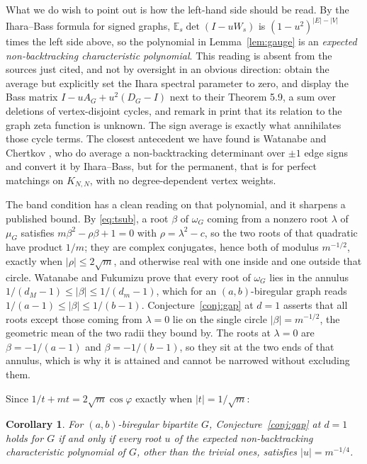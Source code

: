 \documentclass[11pt]{article}
\newtheorem{corollary}[theorem]{Corollary}
\theoremstyle{remark}
\begin{document}
What we do wish to point out is how the left-hand side should be read. By the
Ihara--Bass formula for signed graphs, $\mathbb E_s\det(I-uW_s)$ is
$(1-u^2)^{|E|-|V|}$ times the left side above, so the polynomial in
Lemma~\ref{lem:gauge} is an \emph{expected non-backtracking characteristic
polynomial}. This reading is absent from the sources just cited, and not by
oversight in an obvious direction: \cite{CC} obtain the average but explicitly set
the Ihara spectral parameter to zero, and \cite{WF} display the Bass matrix
$I-uA_G+u^2(D_G-I)$ next to their Theorem 5.9, a sum over deletions of
vertex-disjoint cycles, and remark in print that its relation to the graph zeta
function is unknown. The sign average is exactly what annihilates those cycle
terms. The closest antecedent we have found is Watanabe and Chertkov
\cite[Thm.~4]{WC}, who do average a non-backtracking determinant over $\pm1$ edge
signs and convert it by Ihara--Bass, but for the permanent, that is for perfect
matchings on $K_{N,N}$, with no degree-dependent vertex weights.

The band condition has a clean reading on that polynomial, and it sharpens a
published bound. By \eqref{eq:tsub}, a root $\beta$ of $\omega_G$ coming from a
nonzero root $\lambda$ of $\mu_G$ satisfies $m\beta^2-\rho\beta+1=0$ with
$\rho=\lambda^2-c$, so the two roots of that quadratic have product $1/m$; they are
complex conjugates, hence both of modulus $m^{-1/2}$, exactly when
$|\rho|\le2\sqrt m$, and otherwise real with one inside and one outside that circle.
Watanabe and Fukumizu prove \cite[Cor.~5.8]{WF} that every root of $\omega_G$ lies
in the annulus $1/(d_M-1)\le|\beta|\le1/(d_m-1)$, which for an $(a,b)$-biregular
graph reads $1/(a-1)\le|\beta|\le1/(b-1)$. Conjecture~\ref{conj:gap} at $d=1$
asserts that all roots except those coming from $\lambda=0$ lie on the single
circle $|\beta|=m^{-1/2}$, the geometric mean of the two radii they bound by. The
roots at $\lambda=0$ are $\beta=-1/(a-1)$ and $\beta=-1/(b-1)$, so they sit at the
two ends of that annulus, which is why it is attained and cannot be narrowed
without excluding them.

Since $1/t+mt=2\sqrt m\cos\varphi$ exactly when $|t|=1/\sqrt m$:

\begin{corollary}\label{cor:ramanujan}
For $(a,b)$-biregular bipartite $G$, Conjecture~\ref{conj:gap} at $d=1$ holds for
$G$ if and only if every root $u$ of the expected non-backtracking characteristic
polynomial of $G$, other than the trivial ones, satisfies $|u|=m^{-1/4}$.
\end{corollary}
\end{document}
